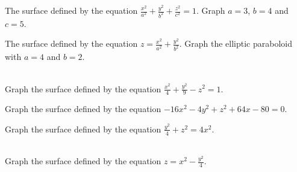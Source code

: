 \documentclass[../mathNotesPreamble]{subfiles}
\begin{document}
    \begin{ex*}[An ellipsoid]
      The surface defined by the equation $\displaystyle \frac{x^2}{a^2}+\frac{y^2}{b^2}+\frac{z^2}{c^2}=1$. Graph $a=3$, $b=4$ and $c=5$.
    \end{ex*}
    \pagebreak

    \begin{ex*}
      The surface defined by the equation $\displaystyle z=\frac{x^2}{a^2}+\frac{y^2}{b^2}$. Graph the elliptic paraboloid with $a=4$ and $b=2$.
    \end{ex*}
    \pagebreak

    \begin{ex*}\mbox{}\\
      Graph the surface defined by the equation $\displaystyle \frac{x^2}{4}+\frac{y^2}{9}-z^2=1$.
    \end{ex*}
    \pagebreak
    
    \begin{ex*}
      Graph the surface defined by the equation $-16x^2-4y^2+z^2+64x-80=0.$
    \end{ex*}
    \pagebreak

    \begin{ex*}
      Graph the surface defined by the equation $\displaystyle \frac{y^2}{4}+z^2=4x^2$.
    \end{ex*}
    \pagebreak

    \begin{ex*}\mbox{}\\
      Graph the surface defined by the equation $\displaystyle z=x^2-\frac{y^2}{4}$. 
    \end{ex*}
    \pagebreak

    
  
\end{document}
